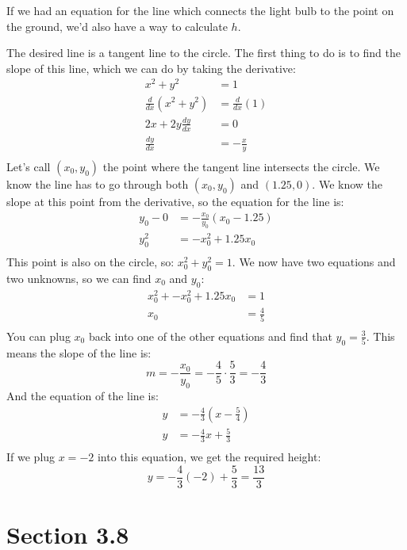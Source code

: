 \documentclass{exam}
\begin{document}
\begin{solution}

If we had an equation for the line which connects the light bulb to the point on the ground, we'd also have a way to
calculate $h$.

The desired line is a tangent line to the circle.  The first thing to do is to find the slope of this line, which we
can do by taking the derivative:
\begin{align*}
  x^2 + y^2 &= 1 \\ 
  \frac{d}{dx} (x^2 + y^2) &= \frac{d}{dx}(1) \\ 
  2x + 2y \frac{dy}{dx} &= 0 \\ 
  \frac{dy}{dx} &= - \frac{x}{y} \\ 
\end{align*}
Let's call $(x_0, y_0)$ the point where the tangent line intersects the circle.  We know the line has to go through both
$(x_0, y_0)$ and $(1.25, 0)$.  We know the slope at this point from the derivative, so the equation for the line is:
\begin{align*}
  y_0 - 0 &= - \frac{x_0}{y_0}(x_0 - 1.25) \\
  y_0^2 &= -x_0^2 + 1.25x_0 \\
\end{align*}
This point is also on the circle, so: $x_0^2 + y_0^2 = 1$.  We now have two equations and two unknowns, so we can find
$x_0$ and $y_0$:
\begin{align*}
  x_0^2 + -x_0^2 + 1.25x_0 &= 1 \\
  x_0 &= \frac{4}{5} \\  
\end{align*}
You can plug $x_0$ back into one of the other equations and find that $y_0 = \frac{3}{5}$.  This means the slope of the
line is:
\[
  m = -\frac{x_0}{y_0} = - \frac{4}{5} \cdot \frac{5}{3} = - \frac{4}{3}
\]
And the equation of the line is:
\begin{align*}
  y &= - \frac{4}{3} \left( x - \frac{5}{4} \right) \\
  y &= -\frac{4}{3} x + \frac{5}{3} \\
\end{align*}
If we plug $x = -2$ into this equation, we get the required height:
\[
  y = -\frac{4}{3} (-2) + \frac{5}{3} = \frac{13}{3}
\]

\end{solution}

\ifprintanswers

\section{Section 3.8}
\end{document}
